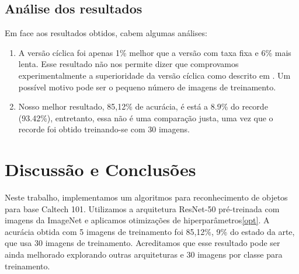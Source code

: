\documentclass[conference]{IEEEtran}
\begin{document}
\subsection{Análise dos resultados}
Em face aos resultados obtidos, cabem algumas análises:
\begin{enumerate}
    \item A versão cíclica foi apenas 1\% melhor que a versão com taxa fixa e 6\% mais lenta. Esse resultado não nos permite dizer que comprovamos experimentalmente a superioridade da versão cíclica como descrito em \cite{annealing, fastai}. Um possível motivo pode ser o pequeno número de imagens de treinamento.
    \item Nosso melhor resultado, 85,12\% de acurácia, é está a 8.9\% do recorde (93.42\%\cite{he}), entretanto, essa não é uma comparação justa, uma vez que o recorde foi obtido treinando-se com 30 imagens.
\end{enumerate}


\section{Discussão e Conclusões}
Neste trabalho, implementamos um algoritmos para reconhecimento de objetos para base Caltech 101. Utilizamos a arquitetura ResNet-50 pré-treinada com imagens da ImageNet e aplicamos otimizações de hiperparâmetros\ref{opt}. A acurácia obtida com 5 imagens de treinamento foi 85,12\%, 9\% do estado da arte, que usa 30 imagens de treinamento. Acreditamos que esse resultado pode ser ainda melhorado explorando outras arquiteturas e 30 imagens por classe para treinamento. 




\end{document}
